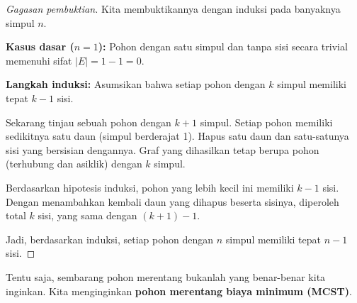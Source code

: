 \begin{proof}[Gagasan pembuktian]
Kita membuktikannya dengan induksi pada banyaknya simpul \( n \).

\textbf{Kasus dasar (\( n = 1 \)):}  
Pohon dengan satu simpul dan tanpa sisi secara trivial memenuhi sifat \( |E| = 1 - 1 = 0 \).

\begin{center}
\end{center}

\textbf{Langkah induksi:}  
Asumsikan bahwa setiap pohon dengan \( k \) simpul memiliki tepat \( k - 1 \) sisi.

Sekarang tinjau sebuah pohon dengan \( k + 1 \) simpul. Setiap pohon memiliki sedikitnya satu daun (simpul berderajat 1). Hapus satu daun dan satu-satunya sisi yang bersisian dengannya. Graf yang dihasilkan tetap berupa pohon (terhubung dan asiklik) dengan \( k \) simpul.

Berdasarkan hipotesis induksi, pohon yang lebih kecil ini memiliki \( k - 1 \) sisi. Dengan menambahkan kembali daun yang dihapus beserta sisinya, diperoleh total \( k \) sisi, yang sama dengan \( (k + 1) - 1 \).

\begin{center}
\vspace{1cm}
\end{center}

Jadi, berdasarkan induksi, setiap pohon dengan \( n \) simpul memiliki tepat \( n - 1 \) sisi.
\end{proof}

Tentu saja, sembarang pohon merentang bukanlah yang benar-benar kita inginkan.  Kita menginginkan \textbf{pohon merentang biaya minimum (MCST)}.

